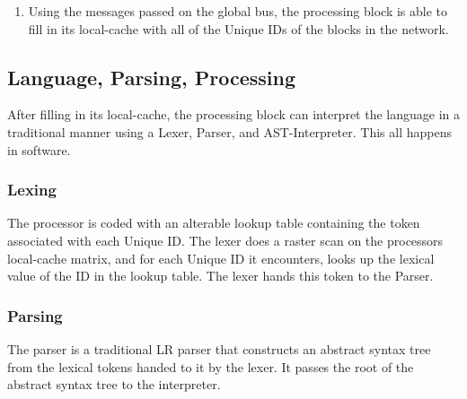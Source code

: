 \begin{enumerate}
\begin{enumerate}
          \item Until the end of the line is reached, whenever a block receives a vector from its western neighbor, each block increments the x component of its position vector, emits a message on the global bus containing \begin{verbatim}[position vector, unique ID]\end{verbatim}then passes its position vector to its eastern neighbor.
          \item The last block on the line increments the x component of its position vector, then emits a message on the global bus containing \begin{verbatim}[position vector, unique ID, END_OF_DIMENSION]\end{verbatim}
        \end{enumerate}
      \item Using the messages passed on the global bus, the processing block is able to fill in its local-cache with all of the Unique IDs of the blocks in the network.
      \end{enumerate}
  \subsection{Language, Parsing, Processing}
    After filling in its local-cache, the processing block can interpret the language in a traditional manner using a Lexer, Parser, and AST-Interpreter. This all happens in software.
    \subsubsection{Lexing}
      The processor is coded with an alterable lookup table containing the token associated with each Unique ID. The lexer does a raster scan on the processors local-cache matrix, and for each Unique ID it encounters, looks up the lexical value of the ID in the lookup table. The lexer hands this token to the Parser.
    \subsubsection{Parsing}
      The parser is a traditional LR parser that constructs an abstract syntax tree from the lexical tokens handed to it by the lexer. It passes the root of the abstract syntax tree to the interpreter.
